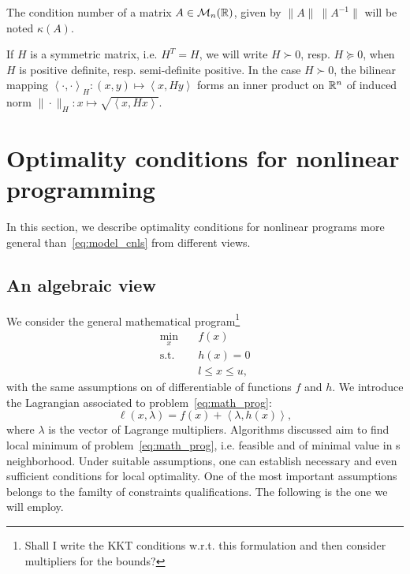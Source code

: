 \documentclass[10pt]{article}
\numberwithin{equation}{section}
\newcommand{\scal}[2]{\left\langle {#1} , {#2} \right\rangle} %
\begin{document}
	The condition number of a matrix $A\in {\mathcal{M}}_n({\mathbb{R}})$, given by $\|A\|\ \|A^{-1}\|$ will be noted $\kappa(A)$. 
	
	If $H$ is a symmetric matrix, i.e. $H^T=H$, we will write $H \succ 0$, resp. $H \succeq 0$, when $H$ is positive definite, resp. semi-definite positive. In the case $H\succ 0$, the bilinear mapping $\scal{\cdot}{\cdot}_H:(x,y) \mapsto \scal{x}{Hy} $ forms an inner product on ${\mathbb{R}}^n$ of induced norm $\|\cdot\|_H:x\mapsto \sqrt{\scal{x}{Hx}}$.
	
	
	\section{Optimality conditions for nonlinear programming}\label{sec:nlp_optimality_conditions}
	
	In this section, we describe optimality conditions for nonlinear programs more general than~\eqref{eq:model_cnls} from different views.
	
	\subsection{An algebraic view}
	
	We consider the general mathematical program\footnote{Shall I write the KKT conditions w.r.t. this formulation and then consider multipliers for the bounds?}
	\begin{equation}
		\label{eq:math_prog}
		\begin{aligned}
			\min_x \quad & f(x) \\
			\text{s.t.} \quad & h(x)=0 \\
			& l \le x \le u,
		\end{aligned}
	\end{equation}
	with the same assumptions on of differentiable of functions $f$ and \(h\). We introduce the Lagrangian associated to problem~\eqref{eq:math_prog}:
	\begin{equation}
		\label{eq:lagrangian}
		\ell(x,\lambda) = f(x) + \scal{\lambda}{h(x)},
	\end{equation}
	where $\lambda$ is the vector of Lagrange multipliers. Algorithms discussed aim to find local minimum of problem~\eqref{eq:math_prog}, i.e. feasible and of minimal value in s neighborhood. Under suitable assumptions, one can establish necessary and even sufficient conditions for local optimality. One of the most important assumptions belongs to the familty of constraints qualifications. The following is the one we will employ.
	
\end{document}
